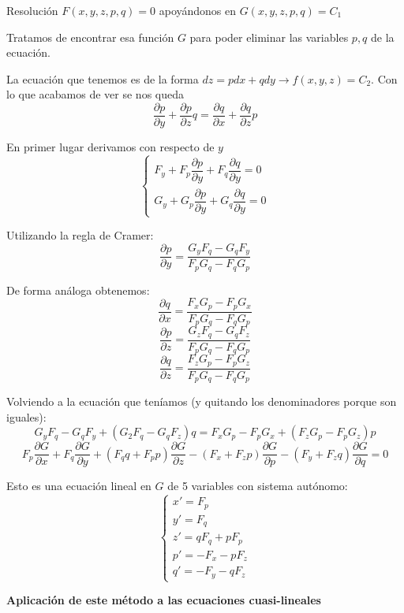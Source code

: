 \documentclass[openany]{book}
\begin{document}
\begin{method}
  Resolución $ F(x,y,z,p,q)=0 $ apoyándonos en $ G(x,y,z,p,q)=C_1 $

  Tratamos de encontrar esa función $ G $ para poder eliminar las variables $ p,q $ de la ecuación.

  La ecuación que tenemos es de la forma $ dz = p dx +qdy \to f(x,y,z) = C_2 $. Con lo que acabamos de ver se nos queda
  $$ \dfrac{\partial p}{\partial y}+ \dfrac{\partial p}{\partial z}q = \dfrac{\partial q}{\partial x} + \dfrac{\partial q}{\partial z}p $$
  

  En primer lugar derivamos con respecto de $ y $
  $$ \left\{
  \begin{array}{l}
    F_{y}+F_{p} \dfrac{\partial p}{\partial y} + F_{q} \dfrac{\partial q}{\partial y} = 0\\ 
    G_{y} + G_{p} \dfrac{\partial p}{\partial y} + G_{q} \dfrac{\partial q}{\partial y} = 0 
  \end{array}
  \right. $$

  Utilizando la regla de Cramer:
  $$ \dfrac{\partial p}{\partial y} = \dfrac{G_{y}F_{q}-G_{q}F_{y}}{F_{p}G_{q}-F_{q}G_{p}} $$
  
  De forma análoga obtenemos:
  $$ \dfrac{\partial q}{\partial x} = \dfrac{F_{x}G_{p}-F_{p}G_{x}}{F_{p}G_{q}-F_{q}G_{p}} $$
  $$ \dfrac{\partial p}{\partial z} = \dfrac{G_{z}F_{q}-G_{q}F_{z}}{F_{p}G_{q}-F_{q}G_{p}} $$
  $$ \dfrac{\partial q}{\partial z} = \dfrac{F_{z}G_{p}-F_{p}G_{z}}{F_{p}G_{q}-F_{q}G_{p}} $$

  Volviendo a la ecuación que teníamos (y quitando los denominadores porque son iguales):
  $$ G_{y}F_{q}-G_{q}F_{y} + (G_{2}F_{q}-G_{q}F_{z})q = F_{x}G_{p}-F_{p}G_{x}+(F_{z}G_{p}-F_{p}G_{z})p $$
  $$ F_{p} \dfrac{\partial G}{\partial x} + F_{q} \dfrac{\partial G}{\partial y} + (F_{q}q+F_{p}p)  \dfrac{\partial G}{\partial z} - (F_{x}+F_{z}p) \dfrac{\partial G}{\partial p} - (F_{y}+F_{z}q) \dfrac{\partial G}{\partial q} = 0$$

  Esto es una ecuación lineal en $ G $ de 5 variables con sistema autónomo:
  $$ \left\{
  \begin{array}{l}
    x'=F_{p}\\ 
    y' = F_{q} \\ 
    z' = qF_{q}+pF_{p}\\ 
    p' = -F_{x}-pF_{z}\\ 
    q' = -F_{y}-qF_{z}
  \end{array}
  \right. $$
  
\end{method}
\vspace{10mm}
\textbf{Aplicación de este método a las ecuaciones cuasi-lineales}
\end{document}
